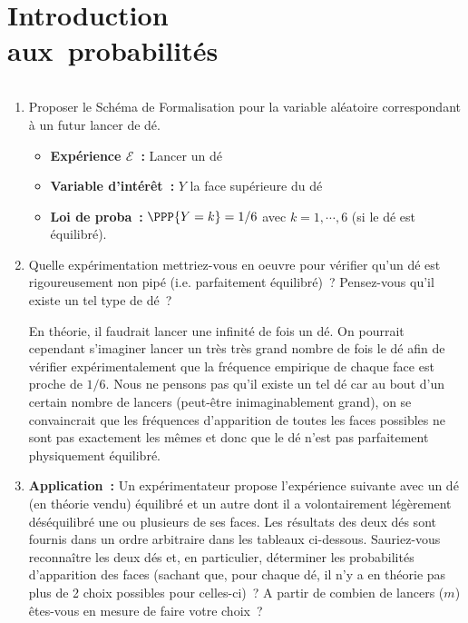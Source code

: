 \documentclass[10pt]{report}
\begin{document}
\chapter{Introduction\\ aux~probabilités}\label{TdProb}



\begin{exercice}[Lancer d'un dé] ${ }$\label{ex:des}

\begin{enumerate}
\item Proposer le Schéma de Formalisation pour la variable aléatoire correspondant à un futur lancer de dé.\\
\begin{Correction}
\begin{itemize}
\item \textbf{Expérience $\mathcal{E}$~:} Lancer un dé
\item \textbf{Variable d'intérêt~:} $Y$ la face supérieure du dé
\item \textbf{Loi de proba~:} $\PPP{Y=k}=1/6$ avec $k=1,\cdots,6$ (si le dé est équilibré).
\end{itemize}
\end{Correction} 

\item Quelle expérimentation mettriez-vous en oeuvre pour vérifier qu'un dé est rigoureusement non pipé (i.e. parfaitement équilibré)~? Pensez-vous qu'il existe un tel type de dé~?

\begin{Correction}En théorie, il faudrait lancer une infinité de fois un dé. On pourrait cependant s'imaginer lancer un très très grand nombre de fois le dé afin de vérifier expérimentalement que la fréquence empirique de chaque face est proche de $1/6$. Nous ne pensons pas qu'il existe un tel dé car au bout d'un certain nombre de lancers (peut-être inimaginablement grand), on se convaincrait que les  fréquences d'apparition de toutes les faces possibles ne sont pas exactement les mêmes et donc que le dé n'est pas parfaitement physiquement équilibré.
\end{Correction}

\item \textbf{Application~:} Un expérimentateur propose l'expérience suivante avec un dé (en théorie vendu) équilibré et un autre dont il a volontairement légèrement déséquilibré une ou plusieurs de ses faces. Les résultats des deux dés sont fournis dans un ordre arbitraire dans les tableaux ci-dessous. Sauriez-vous reconnaître les deux dés et, en particulier, déterminer les probabilités d'apparition des faces (sachant que, pour chaque dé, il n'y a en théorie pas plus de 2 choix possibles pour celles-ci)~? A partir de combien de lancers ($m$) êtes-vous en mesure de faire votre choix~?


\end{enumerate}
\end{exercice}
\end{document}
